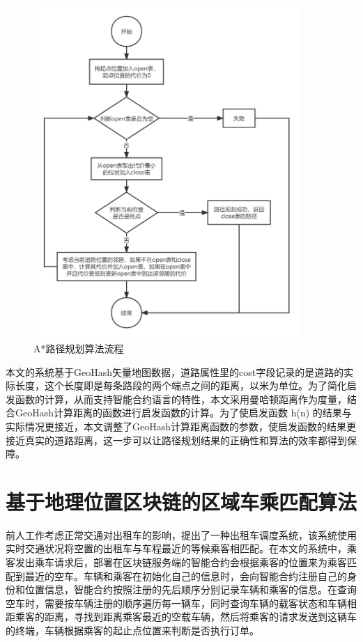 \begin{figure}[h]
  \centering
  \includegraphics[width=0.9\textwidth]{figures/astar算法流程}
  \caption{A*路径规划算法流程}\label{fig:astar}
\end{figure}

本文的系统基于GeoHash矢量地图数据，道路属性里的cost字段记录的是道路的实际长度，这个长度即是每条路段的两个端点之间的距离，以米为单位。为了简化启发函数的计算，从而支持智能合约语言的特性，本文采用曼哈顿距离作为度量，结合GeoHash计算距离的函数进行启发函数的计算。为了使启发函数 h(n) 的结果与实际情况更接近，本文调整了GeoHash计算距离函数的参数，使启发函数的结果更接近真实的道路距离，这一步可以让路径规划结果的正确性和算法的效率都得到保障。

\section{基于地理位置区块链的区域车乘匹配算法}

前人工作考虑正常交通对出租车的影响，提出了一种出租车调度系统，该系统使用实时交通状况将空置的出租车与车程最近的等候乘客相匹配。在本文的系统中，乘客发出乘车请求后，部署在区块链服务端的智能合约会根据乘客的位置来为乘客匹配到最近的空车。车辆和乘客在初始化自己的信息时，会向智能合约注册自己的身份和位置信息，智能合约按照注册的先后顺序分别记录车辆和乘客的信息。在查询空车时，需要按车辆注册的顺序遍历每一辆车，同时查询车辆的载客状态和车辆相距乘客的距离，寻找到距离乘客最近的空载车辆，然后将乘客的请求发送到这辆车的终端，车辆根据乘客的起止点位置来判断是否执行订单。

